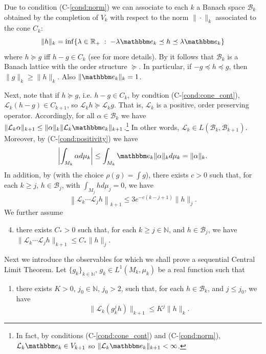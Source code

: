 \documentclass{amsart}
\numberwithin{equation}{section}
\newcommand\cB{{\mathcal B}}
\newcommand\cL{{\mathcal L}}
\newcommand\bN{{\mathbb N}}
\newcommand\bR{{\mathbb R}}
\newcommand{\bbe}{\mathbbm e}
\begin{document}
Due to condition (C-\ref{cond:norm}) we can associate to each $k$ a Banach space $\cB_k$ obtained by the completion of $V_k$ with respect to the norm $\|\cdot\|_k$ associated to the cone $C_k$:
\begin{equation}
\label{eq:real cone norm}
\|h\|_k=\inf\{\lambda\in\bR_+\;:\; -\lambda\bbe_k\preceq h\preceq \lambda \bbe_k\}
\end{equation}
where $h\succeq g$ iff $h-g\in C_k$ (see \cite[Equation D.2.1]{DKL} for more details). By \cite[Lemma D.5]{DKL} it follows that $\cB_k$ is a Banach lattice with the order structure $\succeq$. In particular, if $-g\preceq h\preceq g$, then $\|g\|_k\geq \|h\|_k$. Also $\|\bbe_k\|_k=1$.

Next, note that if $h\succeq g$, i.e. $h-g\in C_k$, by condtion (C-\ref{cond:cone_cont}), $\cL_k(h-g)\in C_{k+1}$, so  $\cL_kh \succeq\cL_k g$. That is, $\cL_k$ is a positive, order preserving operator.
Accordingly, for all $\alpha\in\cB_k$ we have $\|\cL_k\alpha\|_{k+1}\leq \|\alpha\|_k\|\cL_k\bbe_k\|_{k+1}$.\footnote{ In fact, by conditions  (C-\ref{cond:cone_cont}) and (C-\ref{cond:norm}), $\cL_k\bbe_k\in V_{k+1}$ so $\|\cL_{k}\bbe_k\|_{k+1}<\infty$.}
In other words, $\cL_k\in L(\cB_k,\cB_{k+1})$.  Moreover, by (C-\ref{cond:positivity}) we have 
\begin{equation}\label{eq:int_bound}
\left|\int_{M_k}\alpha d\mu_k\right|\leq \int_{M_k}\bbe_k \|\alpha\|_kd\mu_k=\|\alpha\|_k.
\end{equation}
In addition, by \cite[Lemma D.4]{DKL} (with the choice $\rho(g)=\int g$), there exists $c>0$ such that, for each $k\geq j$, $h\in\cB_j$, with $\int_{M_j}hd\mu_j=0$, we have
\begin{equation} \label{eq:decay_real}
\left\|\cL_k\cdots\cL_j h\right\|_{k+1}\leq 3 e^{-c(k-j +1 )}\|h\|_{j}.
\end{equation}
 We further assume
\begin{enumerate}[\bf (C-1)]\setcounter{enumi}{3}
\item \label{cond:powerbounded} there exists $C_*>0$ such that, for each $ k\geq j\in\bN$, and $h\in\cB_j$, we have $\|\cL_{k}\cdots \cL_j h\|_{k+1}\leq C_*\|h\|_j$.
 \end{enumerate}
 
 Next we introduce the observables for which we shall prove a sequential Central Limit Theorem.
Let $\{g_k\}_{k\in\bN}$, $g_k\in L^1(M_k,\mu_k)$  be a real function such that

\smallskip
 \begin{enumerate}[\bf (O-1)] 
 \item \label{cond:multiplier} there exists $K>0$, $j_0\in \bN$, $j_0>2$, such that, for each $h\in\cB_k$, and $j\leq j_0$, we have 
 \[
 \|\cL_k (g_k^j h)\|_{k+1}\leq K^j\|h\|_k.
 \] 
 \end{enumerate}
\end{document}
